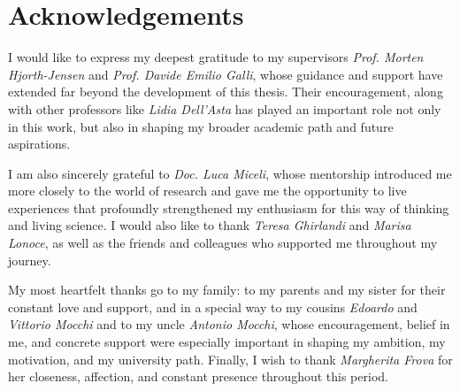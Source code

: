 


\newpage
\section*{Acknowledgements}

I would like to express my deepest gratitude to my supervisors \emph{Prof. Morten Hjorth-Jensen} and \emph{Prof. Davide Emilio Galli}, whose guidance and support have extended far beyond the development of this thesis. Their encouragement, along with other professors like \emph{Lidia Dell'Asta} has played an important role not only in this work, but also in shaping my broader academic path and future aspirations.

I am also sincerely grateful to \emph{Doc. Luca Miceli}, whose mentorship introduced me more closely to the world of research and gave me the opportunity to live experiences that profoundly strengthened my enthusiasm for this way of thinking and living science. I would also like to thank \emph{Teresa Ghirlandi} and \emph{Marisa Lonoce}, as well as the friends and colleagues who supported me throughout my journey.

My most heartfelt thanks go to my family: to my parents and my sister for their constant love and support, and in a special way to my cousins \emph{Edoardo} and \emph{Vittorio Mocchi} and to my uncle \emph{Antonio Mocchi}, whose encouragement, belief in me, and concrete support were especially important in shaping my ambition, my motivation, and my university path. Finally, I wish to thank \emph{Margherita Frova} for her closeness, affection, and constant presence throughout this period.
